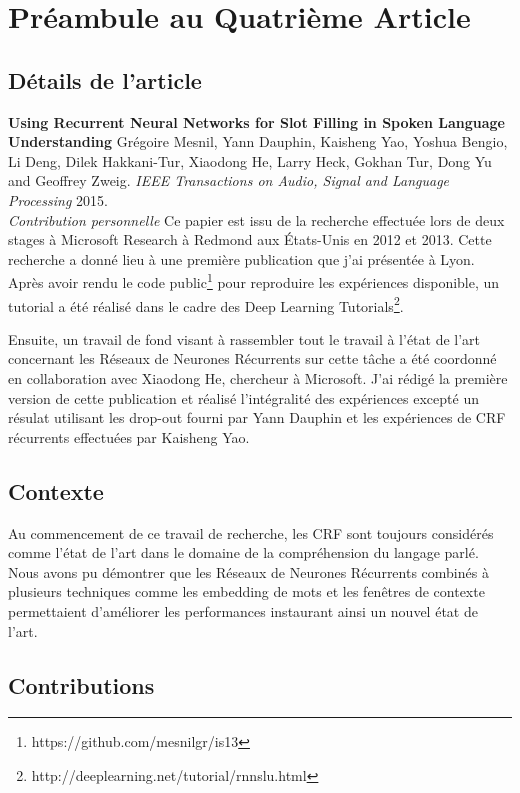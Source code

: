 \chapter{Pr\'{e}ambule au Quatri\`{e}me Article }

\section{D\'{e}tails de l'article}

{\bf Using Recurrent Neural Networks for Slot Filling in Spoken Language
Understanding} Grégoire Mesnil, Yann Dauphin, Kaisheng Yao, Yoshua Bengio, Li
Deng, Dilek Hakkani-Tur, Xiaodong He, Larry Heck, Gokhan Tur, Dong Yu and
Geoffrey Zweig. {\it IEEE Transactions on Audio, Signal and Language
Processing} 2015. \\

{\it Contribution personnelle} Ce papier est issu de la recherche effectuée
lors de deux stages à Microsoft Research à Redmond aux États-Unis en 2012 et
2013. Cette recherche a donné lieu à une première publication
\citep{mesnil-et-al-Interspeech2013} que j'ai présentée à Lyon. Après avoir
rendu le code public\footnote{https://github.com/mesnilgr/is13} pour reproduire
les expériences disponible, un tutorial a été réalisé dans le cadre des Deep
Learning Tutorials\footnote{http://deeplearning.net/tutorial/rnnslu.html}.

Ensuite, un travail de fond visant à rassembler tout le travail à l'état de
l'art concernant les Réseaux de Neurones Récurrents sur cette tâche a été
coordonné en collaboration avec Xiaodong He, chercheur à Microsoft. J'ai rédigé
la première version de cette publication et réalisé l'intégralité des
expériences excepté un résulat utilisant les drop-out fourni par Yann Dauphin
et les expériences de CRF récurrents effectuées par Kaisheng Yao. 

\section{Contexte}

Au commencement de ce travail de recherche, les CRF sont toujours considérés
comme l'état de l'art dans le domaine de la compréhension du langage parlé.
Nous avons pu démontrer que les Réseaux de Neurones Récurrents combinés à
plusieurs techniques comme les embedding de mots et les fenêtres de contexte
permettaient d'améliorer les performances instaurant ainsi un nouvel état de
l'art.

\section{Contributions}

